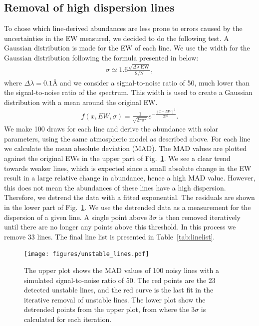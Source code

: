 \documentclass{aa}
\begin{document}
\subsection{Removal of high dispersion lines}
\label{sub:removal_of_unstable_lines}

To chose which line-derived abundances are less prone to errors caused
by the uncertainties in the EW measured, we decided to do the following
test. A Gaussian distribution is made for the EW of each line. We use
the width for the Gaussian distribution following the formula presented
in \citet{Caryel1988} below:
\begin{align}
    \sigma \simeq 1.6 \frac{\sqrt{\Delta\lambda\; \mathrm{EW}}}{\mathrm{S/N}},
\end{align}
where $\Delta\lambda=0.1\si{\angstrom}$ and we consider a
signal-to-noise ratio of 50, much lower than the signal-to-noise ratio
of the spectrum. This width is used to create a Gaussian distribution
with a mean around the original EW.
\begin{align}
    f(x, EW, \sigma) = \frac{1}{\sqrt{2\pi\sigma^2}} e^{-\frac{(x-EW)^2}{2\sigma^2}}.
\end{align}
We make 100 draws for each line and derive the abundance with solar
parameters, using the same atmospheric model as described above. For
each line we calculate the mean absolute deviation (MAD). The MAD values
are plotted against the original EWs in the upper part
of Fig.~\ref{fig:unstable_lines}. We see a clear trend towards weaker
lines, which is expected since a small absolute change in the EW result
in a large relative change in abundance, hence a high MAD value. However, this
does not mean the abundances of these lines have a high dispersion. Therefore, we
detrend the data with a fitted exponential. The residuals are shown in
the lower part of Fig.~\ref{fig:unstable_lines}. We use the detrended
data as a measurement for the dispersion of a given line. A single point
above $3 \sigma$ is then removed iteratively until there are no longer
any points above this threshold. In this process we remove 33 lines. The
final line list is presented in Table~\ref{tab:linelist}.

\begin{figure}[tbp!]
    \centering
    \texttt{[image: figures/unstable\_lines.pdf]}
    \caption{The upper plot shows the MAD values of 100 noisy lines
    with a simulated signal-to-noise ratio of 50. The red points are
    the 23 detected unstable lines, and the red curve is the last fit
    in the iterative removal of unstable lines. The lower plot show the
    detrended points from the upper plot, from where the $3\sigma$ is
    calculated for each iteration.}
    \label{fig:unstable_lines}
\end{figure}
\end{document}
